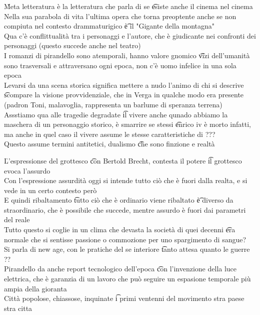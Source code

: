\documentclass[12pt]{article}
\begin{document}
\v

Meta letteratura è la letteratura che parla di se \t esiste anche il cinema nel cinema \\
Nella sua parabola di vita l'ultima opera che torna preoptente anche se non compiuta nel contesto drammaturigico \t è il "Gigante della montagna" \\
Qua c'è conflittualità tra i personaggi e l'autore, che è giudicante nei confronti dei personaggi (questo succede anche nel teatro) \\
I romanzi di pirandello sono atemporali, hanno valore gnomico \t vizi dell'umanità sono trasversali e attraversano ogni epoca, non c'è uomo infelice in una sola epoca \\
Levarsi da una scena storica significa mettere a nudo l'animo di chi si descrive \t scompare la visione provvidenziale, che in Verga in qualche modo era presente (padron Toni, malavoglia, rappresenta un barlume di speranza terrena) \\
Assstiamo qua alle tragedie degradate \t il vivere anche qunado abbiamo la maschera di un personaggio storico, è smarrire se stessi \t enrico iv è morto infatti, ma anche in quel caso il vivere assume le stesse caratteristiche di ??? \\
Questo assume termini antitetici, dualismo \t che sono finzione e realtà

\v

L'espressionse del grottesco \t con Bertold Brecht, contesta il potere \t il grottesco evoca l'assurdo \\
Con l'espressione assurdità oggi si intende tutto ciò che è fuori dalla realta, e si vede in un certo contesto però \\
E quindi ribaltamento \t tutto ciò che è ordinario viene ribaltato \t è diverso da straordinario, che è possibile che succede, mentre assurdo è fuori dai parametri del reale \\
Tutto questo si coglie in un clima che devasta la società di quei decenni \t era normale che si sentisse passione o commozione per uno spargimento di sangue? \\
Si parla di new age, con le pratiche del se interiore \t tanto attesa quanto le guerre ?? \\
Pirandello da anche report tecnologico dell'epoca \t con l'invenzione della luce elettrica, che è garanzia di un lavoro che può seguire un espasione temporale più ampia della gioranta \\
Città popolose, chiassose, inquinate \t i primi ventenni del movimento stra paese stra citta
\end{document}
